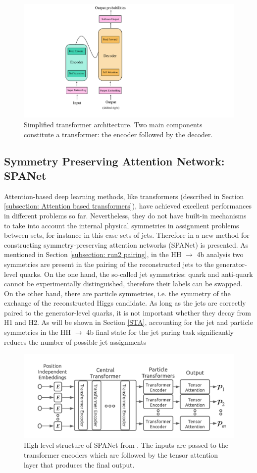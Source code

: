 \begin{figure}[hbt]
    \centering
    \includegraphics[width=0.4\linewidth]{Images/5.SPANet/transformer architecturepdf.pdf}
    \caption{Simplified transformer architecture. Two main components constitute a transformer: the encoder followed by the decoder.}
    \label{fig: transformer architecture}
\end{figure}


\subsection{Symmetry Preserving Attention Network: SPANet} \label{subsection: SPANet}
Attention-based deep learning methods, like transformers (described in Section \ref{subsection: Attention based transformers}), have achieved excellent performances in different problems so far. Nevertheless, they do not have built-in mechanisms to take into account the internal physical symmetries in assignment problems between sets, for instance in this case sets of jets. Therefore in \cite{SPANet} a new method for constructing symmetry-preserving attention networks (SPANet) is presented. As mentioned in Section \ref{subsection: run2 pairing}, in the HH $\to$ 4b analysis two symmetries are present in the pairing of the reconstructed jets to the generator-level quarks. On the one hand, the so-called jet symmetries: quark and anti-quark cannot be experimentally distinguished, therefore their labels can be swapped. On the other hand, there are particle symmetries, i.e. the symmetry of the exchange of the reconstructed Higgs candidate. As long as the jets are correctly paired to the generator-level quarks, it is not important whether they decay from H1 and H2. As will be shown in Section \ref{STA}, accounting for the jet and particle symmetries in the HH $\to$ 4b final state for the jet paring task significantly reduces the number of possible jet assignments

\begin{figure}[hbt]
    \centering
    \includegraphics[width=0.7\linewidth]{Images/5.SPANet/SPANet structure.jpeg}
    \caption{High-level structure of SPANet from \cite{SPANet}. The inputs are passed to the transformer encoders which are followed by the tensor attention layer that produces the final output.}
    \label{fig : SPANet}
\end{figure}


